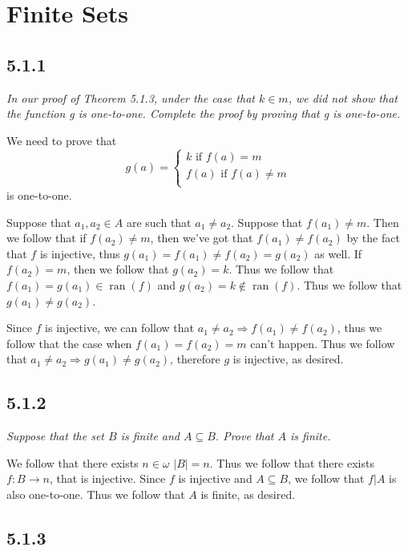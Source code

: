 \documentclass[11pt,oneside,titlepage]{book}
\DeclareMathOperator \ra {\Rightarrow}
\DeclareMathOperator \ran {ran}
\begin{document}
\section{Finite Sets}

\subsection*{5.1.1}

\textit{In our proof of Theorem 5.1.3, under the case that $k \in m$, we did not show
that the function g is one-to-one. Complete the proof by proving that g is
one-to-one.}

We need to prove that
$$g(a) =
\begin{cases}
  k \text{ if } f(a) = m \\
  f(a) \text{ if } f(a) \neq m \\
\end{cases}
$$
is one-to-one.

Suppose that $a_1, a_2 \in A$ are such that $a_1 \neq a_2$.
Suppose that $f(a_1) \neq m$. Then we follow that if $f(a_2) \neq m$, then
we've got that $f(a_1) \neq f(a_2)$ by the fact that $f$ is injective, thus
$g(a_1) = f(a_1) \neq f(a_2) = g(a_2)$ as well.
If $f(a_2) = m$, then we follow that $g(a_2) = k$. Thus we follow that
$f(a_1) = g(a_1) \in \ran(f)$ and $g(a_2) = k \notin \ran(f)$. Thus we follow that
$g(a_1) \neq g(a_2)$.

Since $f$ is injective, we can follow that $a_1 \neq  a_2 \ra f(a_1) \neq f(a_2)$, thus
we follow that the case when $f(a_1) = f(a_2) = m$ can't happen. Thus we follow that
$a_1 \neq a_2 \ra g(a_1) \neq g(a_2)$, therefore $g$ is injective, as desired.

\subsection*{5.1.2}

\textit{Suppose that the set $B$ is finite and $A \subseteq B$. Prove that $A$ is finite.}

We follow that there exists $n \in \omega$ $|B| = n$. Thus we follow that
there exists $f: B \to n$, that is injective. Since $f$ is injective and $A \subseteq B$,
we follow that $f|A$ is also one-to-one. Thus we follow that $A$ is finite, as desired.

\subsection*{5.1.3}
\end{document}
